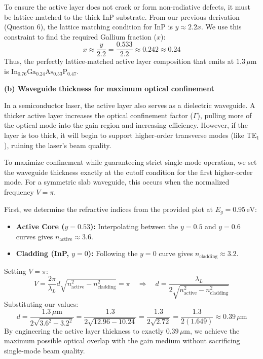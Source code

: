 To ensure the active layer does not crack or form non-radiative defects, it must be lattice-matched to the thick InP substrate. From our previous derivation (Question 6), the lattice matching condition for InP is $y \approx 2.2x$. We use this constraint to find the required Gallium fraction ($x$):
\begin{equation*}
  x \approx \frac{y}{2.2} = \frac{0.533}{2.2} \approx 0.242 \approx 0.24
\end{equation*}
Thus, the perfectly lattice-matched active layer composition that emits at $1.3\,\mu\text{m}$ is $\text{In}_{0.76}\text{Ga}_{0.24}\text{As}_{0.53}\text{P}_{0.47}$.

\textbf{(b) Waveguide thickness for maximum optical confinement}

In a semiconductor laser, the active layer also serves as a dielectric waveguide. A thicker active layer increases the optical confinement factor ($\Gamma$), pulling more of the optical mode into the gain region and increasing efficiency. However, if the layer is too thick, it will begin to support higher-order transverse modes (like TE$_1$), ruining the laser's beam quality. 

To maximize confinement while guaranteeing strict single-mode operation, we set the waveguide thickness exactly at the cutoff condition for the first higher-order mode. For a symmetric slab waveguide, this occurs when the normalized frequency $V = \pi$.

First, we determine the refractive indices from the provided plot at $E_g = 0.95\,\text{eV}$:
\begin{itemize}
    \item \textbf{Active Core ($y=0.53$):} Interpolating between the $y=0.5$ and $y=0.6$ curves gives $n_{\text{active}} \approx 3.6$.
    \item \textbf{Cladding (InP, $y=0$):} Following the $y=0$ curve gives $n_{\text{cladding}} \approx 3.2$.
\end{itemize}

Setting $V = \pi$:
\begin{equation*}
  V = \frac{2\pi}{\lambda_L} d \sqrt{n_{\text{active}}^2 - n_{\text{cladding}}^2} = \pi \quad\Longrightarrow\quad d = \frac{\lambda_L}{2\sqrt{n_{\text{active}}^2 - n_{\text{cladding}}^2}}
\end{equation*}
Substituting our values:
\begin{equation*}
  d = \frac{1.3\,\mu\text{m}}{2\sqrt{3.6^2 - 3.2^2}} = \frac{1.3}{2\sqrt{12.96 - 10.24}} = \frac{1.3}{2\sqrt{2.72}} = \frac{1.3}{2(1.649)} \approx \boxed{0.39\,\mu\text{m}}
\end{equation*}
By engineering the active layer thickness to exactly $0.39\,\mu\text{m}$, we achieve the maximum possible optical overlap with the gain medium without sacrificing single-mode beam quality.

